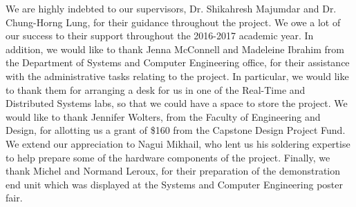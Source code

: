 \documentclass[12pt]{report}
\begin{document}
We are highly indebted to our supervisors, Dr. Shikahresh Majumdar and Dr. Chung-Horng Lung, for their guidance 
throughout the project. We owe a lot of our success to their support throughout the 2016-2017 academic year.
In addition, we would like to thank Jenna McConnell and Madeleine Ibrahim from the Department of Systems and Computer 
Engineering office, for their assistance with the administrative tasks relating to the project. In particular, we would 
like to thank them for arranging a desk for us in one of the Real-Time and Distributed Systems labs, so that we could 
have a space to store the project.
We would like to thank Jennifer Wolters, from the Faculty of Engineering and Design, for allotting us a grant of \$160 
from the Capstone Design Project Fund.
We extend our appreciation to Nagui Mikhail, who lent us his soldering expertise to help prepare some of the hardware 
components of the project.
Finally, we thank Michel and Normand Leroux, for their preparation of the demonstration end unit 
which was displayed at the Systems and Computer Engineering poster fair.



\prefaceTOC %
\listoffigures %
\listoftables %

\end{document}
